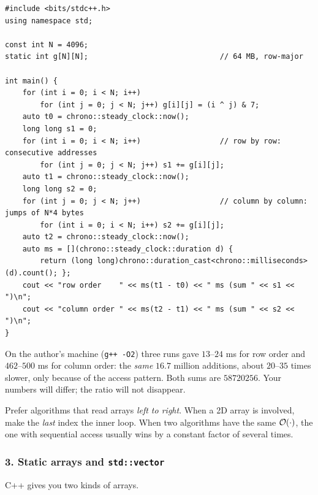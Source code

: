 \begin{lstlisting}[style=cpp]
#include <bits/stdc++.h>
using namespace std;

const int N = 4096;
static int g[N][N];                              // 64 MB, row-major

int main() {
    for (int i = 0; i < N; i++)
        for (int j = 0; j < N; j++) g[i][j] = (i ^ j) & 7;
    auto t0 = chrono::steady_clock::now();
    long long s1 = 0;
    for (int i = 0; i < N; i++)                  // row by row: consecutive addresses
        for (int j = 0; j < N; j++) s1 += g[i][j];
    auto t1 = chrono::steady_clock::now();
    long long s2 = 0;
    for (int j = 0; j < N; j++)                  // column by column: jumps of N*4 bytes
        for (int i = 0; i < N; i++) s2 += g[i][j];
    auto t2 = chrono::steady_clock::now();
    auto ms = [](chrono::steady_clock::duration d) {
        return (long long)chrono::duration_cast<chrono::milliseconds>(d).count(); };
    cout << "row order    " << ms(t1 - t0) << " ms (sum " << s1 << ")\n";
    cout << "column order " << ms(t2 - t1) << " ms (sum " << s2 << ")\n";
}
\end{lstlisting}

On the author's machine (\texttt{g++ -O2}) three runs gave $13$--$24$ ms for row order and $462$--$500$ ms for column order: the \emph{same} $16.7$ million additions, about $20$--$35$ times slower, only because of the access pattern. Both sums are $58720256$. Your numbers will differ; the ratio will not disappear.

\begin{insightbox}
Prefer algorithms that read arrays \emph{left to right}. When a 2D array is involved, make the \emph{last} index the inner loop. When two algorithms have the same $\mathcal{O}(\cdot)$, the one with sequential access usually wins by a constant factor of several times.
\end{insightbox}

\subsubsection*{3. Static arrays and \texttt{std::vector}}

C++ gives you two kinds of arrays.

